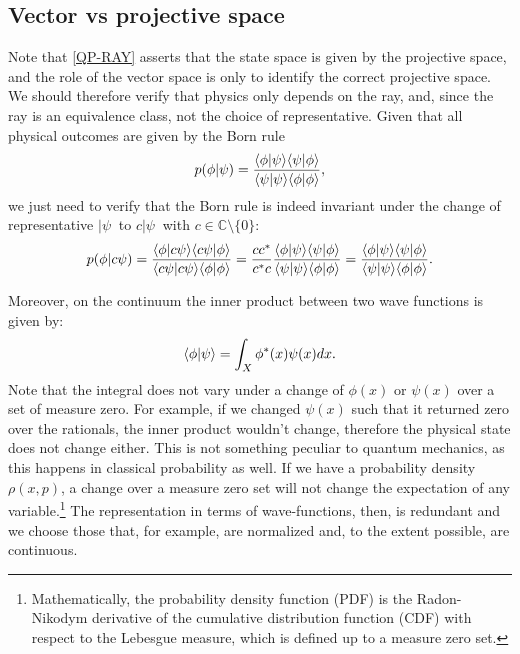 


\subsection{Vector vs projective space}

Note that \ref{QP-RAY} asserts that the state space is given by the projective space, and the role of the vector space is only to identify the correct projective space. We should therefore verify that physics only depends on the ray, and, since the ray is an equivalence class, not the choice of representative. Given that all physical outcomes are given by the Born rule
\begin{equation}
	p(\phi|\psi) = \frac{\langle \phi | \psi \rangle\langle \psi | \phi \rangle}{\langle \psi | \psi \rangle\langle \phi | \phi \rangle},
\end{equation}
we just need to verify that the Born rule is indeed invariant under the change of representative $|\psi\>$ to $c |\psi\>$ with $c \in \mathbb{C} \setminus \{0\}$:
\begin{equation}
	p(\phi|c \psi) = \frac{\langle \phi |c\psi \rangle\langle c\psi | \phi \rangle}{\langle c\psi | c\psi \rangle\langle \phi | \phi \rangle} = \frac{c c^*}{c^* c}\frac{\langle \phi | \psi \rangle\langle \psi | \phi \rangle}{\langle \psi | \psi \rangle\langle \phi | \phi \rangle}=\frac{\langle \phi | \psi \rangle\langle \psi | \phi \rangle}{\langle \psi | \psi \rangle\langle \phi | \phi \rangle}.
\end{equation}

Moreover, on the continuum the inner product between two wave functions is given by:
\begin{equation}
	\langle \phi | \psi \rangle = \int_X \phi^*(x) \psi(x) dx.
\end{equation}
Note that the integral does not vary under a change of $\phi(x)$ or $\psi(x)$ over a set of measure zero. For example, if we changed $\psi(x)$ such that it returned zero over the rationals, the inner product wouldn't change, therefore the physical state does not change either. This is not something peculiar to quantum mechanics, as this happens in classical probability as well. If we have a probability density $\rho(x,p)$, a change over a measure zero set will not change the expectation of any variable.\footnote{Mathematically, the probability density function (PDF) is the Radon-Nikodym derivative of the cumulative distribution function (CDF) with respect to the Lebesgue measure, which is defined up to a measure zero set.} The representation in terms of wave-functions, then, is redundant and we choose those that, for example, are normalized and, to the extent possible, are continuous.

